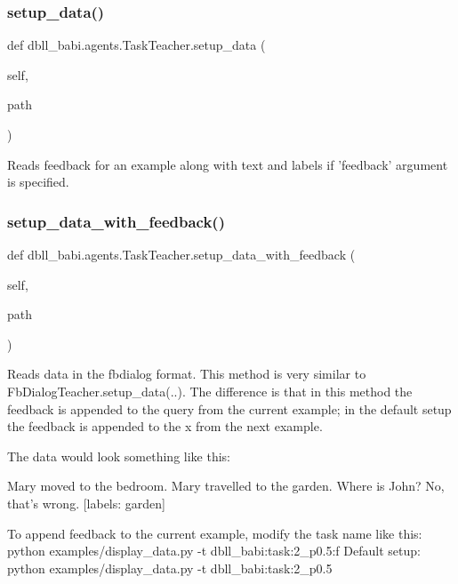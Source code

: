 \subsubsection{\texorpdfstring{setup\+\_\+data()}{setup\_data()}}
{\footnotesize\ttfamily def dbll\+\_\+babi.\+agents.\+Task\+Teacher.\+setup\+\_\+data (\begin{DoxyParamCaption}\item[{}]{self,  }\item[{}]{path }\end{DoxyParamCaption})}

\begin{DoxyVerb}Reads feedback for an example along with text and labels if 'feedback' argument
is specified.
\end{DoxyVerb}
 \mbox{\label{classdbll__babi_1_1agents_1_1TaskTeacher_a3275c0a4a11a3f5e723259d487db03f8}} 
\subsubsection{\texorpdfstring{setup\+\_\+data\+\_\+with\+\_\+feedback()}{setup\_data\_with\_feedback()}}
{\footnotesize\ttfamily def dbll\+\_\+babi.\+agents.\+Task\+Teacher.\+setup\+\_\+data\+\_\+with\+\_\+feedback (\begin{DoxyParamCaption}\item[{}]{self,  }\item[{}]{path }\end{DoxyParamCaption})}

\begin{DoxyVerb}Reads data in the fbdialog format. This method is very similar to
FbDialogTeacher.setup_data(..). The difference is that in this method the
feedback is appended to the query from the current example; in the default setup
the feedback is appended to the x from the next example.

The data would look something like this:

Mary moved to the bedroom.
Mary travelled to the garden.
Where is John?
No, that's wrong.
[labels: garden]

To append feedback to the current example, modify the task name like this:
  python examples/display_data.py -t dbll_babi:task:2_p0.5:f
Default setup:
  python examples/display_data.py -t dbll_babi:task:2_p0.5
\end{DoxyVerb}
 

